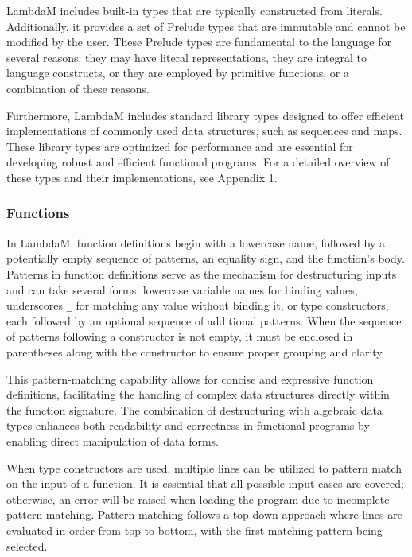 \documentclass{IEEEtran}
\begin{document}
\par LambdaM includes built-in types that are typically constructed from literals. Additionally, it provides a set of Prelude types that are immutable and cannot be modified by the user. These Prelude types are fundamental to the language for several reasons: they may have literal representations, they are integral to language constructs, or they are employed by primitive functions, or a combination of these reasons.

\par Furthermore, LambdaM includes standard library types designed to offer efficient implementations of commonly used data structures, such as sequences and maps. These library types are optimized for performance and are essential for developing robust and efficient functional programs. For a detailed overview of these types and their implementations, see Appendix 1.

\subsubsection{Functions}

\par In LambdaM, function definitions begin with a lowercase name, followed by a potentially empty sequence of patterns, an equality sign, and the function's body. Patterns in function definitions serve as the mechanism for destructuring inputs and can take several forms: lowercase variable names for binding values, underscores \texttt{\_} for matching any value without binding it, or type constructors, each followed by an optional sequence of additional patterns. When the sequence of patterns following a constructor is not empty, it must be enclosed in parentheses along with the constructor to ensure proper grouping and clarity.

\par This pattern-matching capability allows for concise and expressive function definitions, facilitating the handling of complex data structures directly within the function signature. The combination of destructuring with algebraic data types enhances both readability and correctness in functional programs by enabling direct manipulation of data forms.

\par When type constructors are used, multiple lines can be utilized to pattern match on the input of a function. It is essential that all possible input cases are covered; otherwise, an error will be raised when loading the program due to incomplete pattern matching. Pattern matching follows a top-down approach where lines are evaluated in order from top to bottom, with the first matching pattern being selected.
\end{document}
